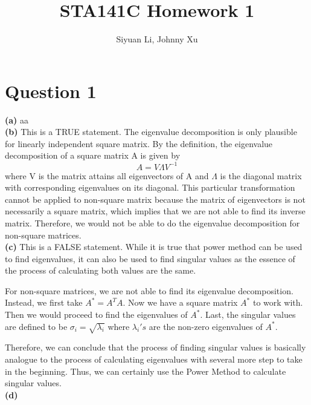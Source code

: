 \documentclass[12pt]{article}
\begin{document}
\title{STA141C Homework 1}
\author{Siyuan Li, Johnny Xu}
\maketitle

\section*{Question 1}
\textbf{(a)}
aa\\
\textbf{(b)}
This is a TRUE statement. The eigenvalue decomposition is only plausible for linearly independent square matrix. By the definition, the eigenvalue decomposition of a square matrix A is given by
$$A = V \Lambda V^{-1}$$
where V is the matrix attains all eigenvectors of A and $\Lambda$ is the diagonal matrix with corresponding eigenvalues on its diagonal. This particular transformation cannot be applied to non-square matrix because the matrix of eigenvectors is not necessarily a square matrix, which implies that we are not able to find its inverse matrix. Therefore, we would not be able to do the eigenvalue decomposition for non-square matrices. \\
\textbf{(c)}
This is a FALSE statement. While it is true that power method can be used to find eigenvalues, it can also be used to find singular values as the essence of the process of calculating both values are the same.

For non-square matrices, we are not able to find its eigenvalue decomposition. Instead, we first take $A^{*} = A^{T}A$. Now we have a square matrix $A^{*}$ to work with. Then we would proceed to find the eigenvalues of $A^{*}$. Last, the singular values are defined to be $\sigma_{i} = \sqrt{\lambda_{i}}$ where $\lambda_{i}'s$ are the non-zero eigenvalues of $A^{*}$. 

Therefore, we can conclude that the process of finding singular values is basically analogue to the process of calculating eigenvalues with several more step to take in the beginning. Thus, we can certainly use the Power Method to calculate singular values. \\
\textbf{(d)}
\end{document}
